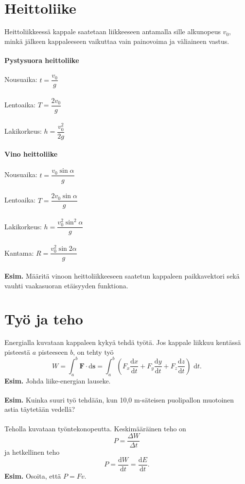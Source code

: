\documentclass{article}
\begin{document}
\section{Heittoliike}
Heittoliikkeessä kappale saatetaan liikkeeseen antamalla sille alkunopeus \(v_0\), minkä jälkeen kappaleeseen vaikuttaa vain painovoima ja väliaineen vastus.\\
 \\
\textbf{Pystysuora heittoliike}\\
 \\
Nousuaika: \(t=\dfrac{v_0}{g}\)\\
 \\
Lentoaika: \(T=\dfrac{2v_0}{g}\)\\
 \\
Lakikorkeus: \(h=\dfrac{v_0^2}{2g}\)\\
 \\
\textbf{Vino heittoliike}\\
 \\
Nousuaika: \(t=\dfrac{v_0 \sin \alpha}{g}\)\\
 \\
Lentoaika: \(T=\dfrac{2v_0 \sin \alpha}{g}\)\\
 \\
Lakikorkeus: \(h=\dfrac{v_0^2 \sin ^2 \alpha}{g}\)\\
 \\
Kantama: \(R=\dfrac{v_0^2 \sin 2\alpha}{g}\)\\
 \\
\textbf{Esim.} Määritä vinoon heittoliikkeeseen saatetun kappaleen paikkavektori sekä vauhti vaakasuoran etäisyyden funktiona.

\newpage
\section{Työ ja teho}
Energialla kuvataan kappaleen kykyä tehdä työtä. Jos kappale liikkuu kentässä pisteestä \(a\) pisteeseen \(b\), on tehty työ $$W=\int_a^b \mathbf{F}\cdot \text{d}\mathbf{s}=\int_a^b \left (F_x\dfrac{\text{d}x}{\text{d}t}+F_y\dfrac{\text{d}y}{\text{d}t}+F_z\dfrac{\text{d}z}{\text{d}t}\right )\text{ d}t.$$ \textbf{Esim.} Johda liike-energian lauseke.\\
 \\
\textbf{Esim.} Kuinka suuri työ tehdään, kun 10,0 m-säteisen puolipallon muotoinen astia täytetään vedellä?\\
 \\
Teholla kuvataan työntekonopeutta. Keskimääräinen teho on $$P=\frac{\Delta W}{\Delta t}$$ ja hetkellinen teho $$P=\frac{\text{d}W}{\text{d}t}=\frac{\text{d}E}{\text{d}t}.$$ \textbf{Esim.} Osoita, että \(P=Fv\).
\end{document}
